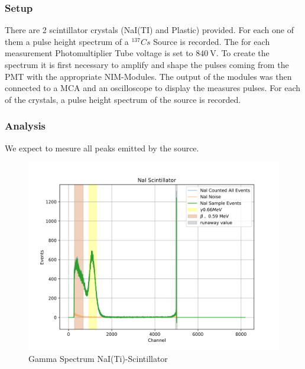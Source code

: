 \documentclass[12pt,twoside,a4paper]{scrartcl}
\begin{document}
		\subsubsection{Setup}

		There are 2 scintillator crystals (NaI(TI) and Plastic) provided. For each one of them a pulse height spectrum of a $^{137}Cs$ Source is recorded. The for each measurement Photomultiplier Tube voltage is set to $\SI{840}{\volt}$. To create the spectrum it is first necessary to amplify and shape the pulses coming from the PMT with the appropriate NIM-Modules. The output of the modules was then connected to a MCA and an oscilloscope to display the measures pulses. For each of the crystals, a pulse height spectrum of the source is recorded.

		\subsubsection{Analysis}
            We expect to mesure all peaks emitted by the source.
            \begin{figure}[H]
                \includegraphics{Plots/Scinti/SpektrenNaI.png}
                \caption{Gamma Spectrum NaI(Ti)-Scintillator}
            \end{figure}
\end{document}
